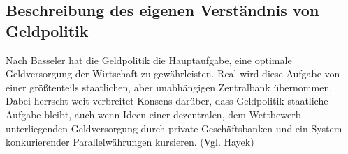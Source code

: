 \documentclass[
      onecolumn,
      a4paper,
      abstracton,
      parskip=half
      ,final
      ]{scrartcl}
\begin{document}
\subsection{Beschreibung des eigenen Verst{\"a}ndnis von Geldpolitik}

Nach \citep[S. 551]{Basseler2010}{Basseler hat die Geldpolitik die Hauptaufgabe, eine optimale Geldversorgung der Wirtschaft zu gewährleisten. Real wird diese Aufgabe von einer größtenteils staatlichen, aber unabhängigen Zentralbank übernommen. Dabei herrscht weit verbreitet Konsens darüber, dass Geldpolitik staatliche Aufgabe bleibt, auch wenn Ideen einer dezentralen, dem Wettbewerb unterliegenden Geldversorgung durch private Geschäftsbanken und ein System konkurierender Parallelwährungen kursieren. (Vgl. Hayek) }
\end{document}
